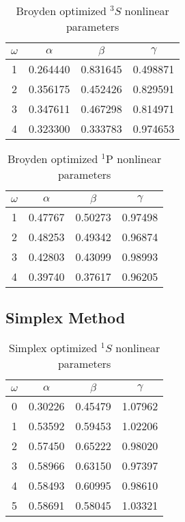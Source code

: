\documentclass[Dissertation.tex]{subfiles}
\begin{document}
\setlength{\abovecaptionskip}{6pt}   %
\setlength{\belowcaptionskip}{6pt}   %
\begin{table}
\centering
\begin{tabular}{c c c c}
\toprule
$\omega$ & $\alpha$ & $\beta$ & $\gamma$ \\ [0.5ex]
\midrule
1 & 0.264440 & 0.831645 & 0.498871 \\
2 & 0.356175 & 0.452426 & 0.829591 \\
3 & 0.347611 & 0.467298 & 0.814971 \\
4 & 0.323300 & 0.333783 & 0.974653 \\
\bottomrule
\end{tabular}
\caption{Broyden optimized $^3S$ nonlinear parameters}
\label{tab:NonlinearOptimized3SBroyden}
\end{table}


\begin{table}
\centering
\begin{tabular}{c c c c}
\toprule
$\omega$ & $\alpha$ & $\beta$ & $\gamma$ \\ [0.5ex]
\midrule
1 & 0.47767 & 0.50273 & 0.97498 \\
2 & 0.48253 & 0.49342 & 0.96874 \\
3 & 0.42803 & 0.43099 & 0.98993 \\
4 & 0.39740 & 0.37617 & 0.96205 \\
\bottomrule
\end{tabular}
\caption{Broyden optimized $^1$P nonlinear parameters}
\label{tab:BroydenPWaveSingOpt}
\end{table}



\subsection{Simplex Method}
\label{sec:Simplex}

\begin{table}
\centering
\begin{tabular}{c c c c}
\toprule
$\omega$ & $\alpha$ & $\beta$ & $\gamma$ \\ [0.5ex]
\midrule
0 & 0.30226 & 0.45479 & 1.07962 \\
1 & 0.53592 & 0.59453 & 1.02206 \\
2 & 0.57450 & 0.65222 & 0.98020 \\
3 & 0.58966 & 0.63150 & 0.97397 \\
4 & 0.58493 & 0.60995 & 0.98610 \\
5 & 0.58691 & 0.58045 & 1.03321 \\
\bottomrule
\end{tabular}
\caption{Simplex optimized $^1S$ nonlinear parameters}
\label{tab:NonlinearOptimized1SSimplex}
\end{table}
\end{document}

